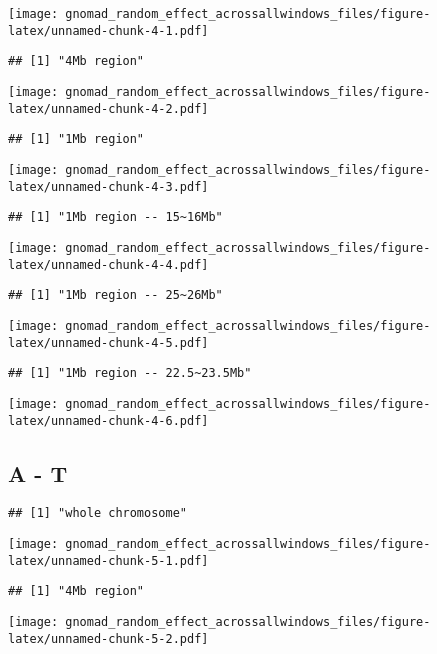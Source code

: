 \documentclass[
]{article}
\begin{document}
\texttt{[image: gnomad\_random\_effect\_acrossallwindows\_files/figure-latex/unnamed-chunk-4-1.pdf]}

\begin{verbatim}
## [1] "4Mb region"
\end{verbatim}

\texttt{[image: gnomad\_random\_effect\_acrossallwindows\_files/figure-latex/unnamed-chunk-4-2.pdf]}

\begin{verbatim}
## [1] "1Mb region"
\end{verbatim}

\texttt{[image: gnomad\_random\_effect\_acrossallwindows\_files/figure-latex/unnamed-chunk-4-3.pdf]}

\begin{verbatim}
## [1] "1Mb region -- 15~16Mb"
\end{verbatim}

\texttt{[image: gnomad\_random\_effect\_acrossallwindows\_files/figure-latex/unnamed-chunk-4-4.pdf]}

\begin{verbatim}
## [1] "1Mb region -- 25~26Mb"
\end{verbatim}

\texttt{[image: gnomad\_random\_effect\_acrossallwindows\_files/figure-latex/unnamed-chunk-4-5.pdf]}

\begin{verbatim}
## [1] "1Mb region -- 22.5~23.5Mb"
\end{verbatim}

\texttt{[image: gnomad\_random\_effect\_acrossallwindows\_files/figure-latex/unnamed-chunk-4-6.pdf]}

\hypertarget{a---t}{%
\subsection{A - T}\label{a---t}}

\begin{verbatim}
## [1] "whole chromosome"
\end{verbatim}

\texttt{[image: gnomad\_random\_effect\_acrossallwindows\_files/figure-latex/unnamed-chunk-5-1.pdf]}

\begin{verbatim}
## [1] "4Mb region"
\end{verbatim}

\texttt{[image: gnomad\_random\_effect\_acrossallwindows\_files/figure-latex/unnamed-chunk-5-2.pdf]}
\end{document}
